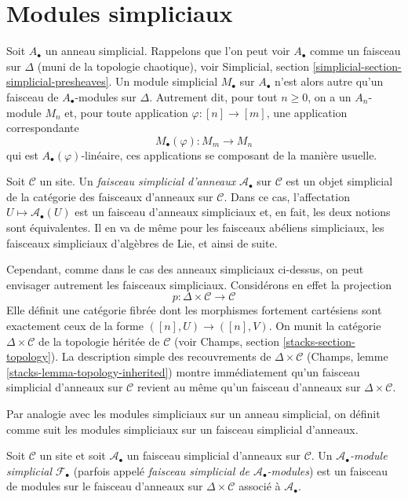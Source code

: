 \section{Modules simpliciaux}
\label{section-simplicial-modules}

\noindent
Soit $A_\bullet$ un anneau simplicial. Rappelons que l'on peut voir
$A_\bullet$ comme un faisceau sur $\Delta$ (muni de la topologie chaotique),
voir Simplicial, section
\ref{simplicial-section-simplicial-presheaves}. Un module simplicial
$M_\bullet$ sur $A_\bullet$ n'est alors autre qu'un faisceau de
$A_\bullet$-modules sur $\Delta$. Autrement dit, pour tout $n \geq 0$, on a
un $A_n$-module $M_n$ et, pour toute application
$\varphi : [n] \to [m]$, une application correspondante
$$
M_\bullet(\varphi) : M_m \longrightarrow M_n
$$
qui est $A_\bullet(\varphi)$-linéaire, ces applications se composant de la
manière usuelle.

\medskip\noindent
Soit $\mathcal{C}$ un site. Un {\it faisceau simplicial d'anneaux}
$\mathcal{A}_\bullet$ sur $\mathcal{C}$ est un objet simplicial de la
catégorie des faisceaux d'anneaux sur $\mathcal{C}$. Dans ce cas,
l'affectation $U \mapsto \mathcal{A}_\bullet(U)$ est un faisceau d'anneaux
simpliciaux et, en fait, les deux notions sont équivalentes. Il en va de même
pour les faisceaux abéliens simpliciaux, les faisceaux simpliciaux d'algèbres
de Lie, et ainsi de suite.

\medskip\noindent
Cependant, comme dans le cas des anneaux simpliciaux ci-dessus, on peut
envisager autrement les faisceaux simpliciaux. Considérons en effet la
projection
$$
p : \Delta \times \mathcal{C} \longrightarrow \mathcal{C}
$$
Elle définit une catégorie fibrée dont les morphismes fortement cartésiens
sont exactement ceux de la forme $([n], U) \to ([n], V)$. On munit la
catégorie $\Delta \times \mathcal{C}$ de la topologie héritée de
$\mathcal{C}$ (voir Champs, section \ref{stacks-section-topology}). La
description simple des recouvrements de $\Delta \times \mathcal{C}$
(Champs, lemme \ref{stacks-lemma-topology-inherited}) montre immédiatement
qu'un faisceau simplicial d'anneaux sur $\mathcal{C}$ revient au même qu'un
faisceau d'anneaux sur $\Delta \times \mathcal{C}$.

\medskip\noindent
Par analogie avec les modules simpliciaux sur un anneau simplicial, on
définit comme suit les modules simpliciaux sur un faisceau simplicial
d'anneaux.

\begin{definition}
\label{definition-simplicial-module}
Soit $\mathcal{C}$ un site et soit $\mathcal{A}_\bullet$ un faisceau
simplicial d'anneaux sur $\mathcal{C}$. Un
{\it $\mathcal{A}_\bullet$-module simplicial} $\mathcal{F}_\bullet$
(parfois appelé {\it faisceau simplicial de
$\mathcal{A}_\bullet$-modules}) est un faisceau de modules sur le faisceau
d'anneaux sur $\Delta \times \mathcal{C}$ associé à
$\mathcal{A}_\bullet$.
\end{definition}

